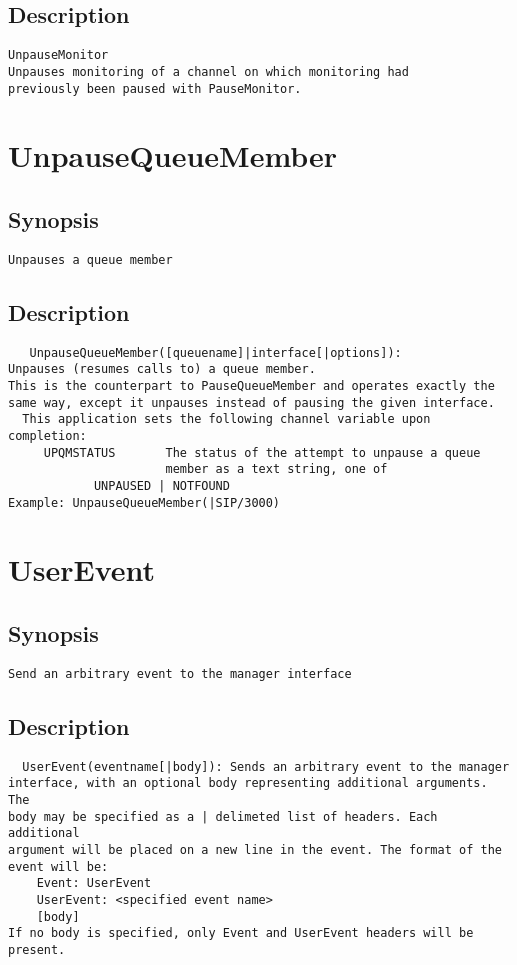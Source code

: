 \subsection{Description}
\begin{verbatim}
UnpauseMonitor
Unpauses monitoring of a channel on which monitoring had
previously been paused with PauseMonitor.

\end{verbatim}


\section{UnpauseQueueMember}
\subsection{Synopsis}
\begin{verbatim}
Unpauses a queue member
\end{verbatim}
\subsection{Description}
\begin{verbatim}
   UnpauseQueueMember([queuename]|interface[|options]):
Unpauses (resumes calls to) a queue member.
This is the counterpart to PauseQueueMember and operates exactly the
same way, except it unpauses instead of pausing the given interface.
  This application sets the following channel variable upon completion:
     UPQMSTATUS       The status of the attempt to unpause a queue 
                      member as a text string, one of
            UNPAUSED | NOTFOUND
Example: UnpauseQueueMember(|SIP/3000)

\end{verbatim}


\section{UserEvent}
\subsection{Synopsis}
\begin{verbatim}
Send an arbitrary event to the manager interface
\end{verbatim}
\subsection{Description}
\begin{verbatim}
  UserEvent(eventname[|body]): Sends an arbitrary event to the manager
interface, with an optional body representing additional arguments.  The
body may be specified as a | delimeted list of headers. Each additional
argument will be placed on a new line in the event. The format of the
event will be:
    Event: UserEvent
    UserEvent: <specified event name>
    [body]
If no body is specified, only Event and UserEvent headers will be present.

\end{verbatim}


